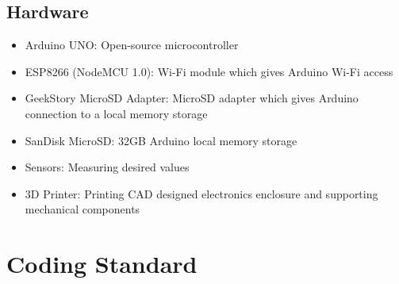 \documentclass[12pt,titlepage]{article}
\begin{document}
\newpage

\subsection{Hardware}
\begin{itemize}
	\item Arduino UNO: Open-source microcontroller 
	\item ESP8266 (NodeMCU 1.0): Wi-Fi module which gives Arduino Wi-Fi access
	\item GeekStory MicroSD Adapter: MicroSD adapter which gives Arduino connection to a local memory storage
	\item SanDisk MicroSD: 32GB Arduino local memory storage 
	\item Sensors: Measuring desired values
	\item 3D Printer: Printing CAD designed electronics enclosure and supporting mechanical components
\end{itemize}



\section{Coding Standard}
\end{document}
